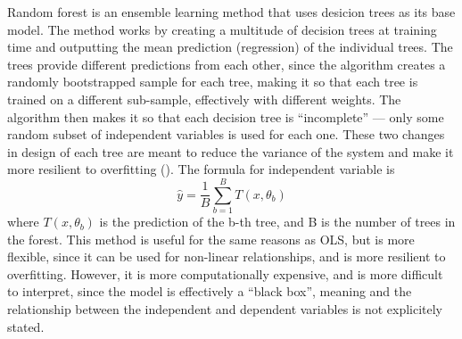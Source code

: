 \documentclass[12pt]{report}
\begin{document}
Random forest is an ensemble learning method that uses desicion trees as its base model. The method works by creating a multitude of decision trees at training time and outputting the mean prediction (regression) of the individual trees. The trees provide different predictions from each other, since the algorithm creates a randomly bootstrapped sample for each tree, making it so that each tree is trained on a different sub-sample, effectively with different weights. The algorithm then makes it so that each decision tree is ``incomplete'' --- only some random subset of independent variables is used for each one. These two changes in design of each tree are meant to reduce the variance of the system and make it more resilient to overfitting (\cite{Breiman2001}). The formula for independent variable is
\begin{equation}
	\hat{y} = \frac{1}{B}\sum_{b=1}^{B}T(x, \theta_b)
\end{equation}
where $T(x, \theta_b)$ is the prediction of the b-th tree, and B is the number of trees in the forest. This method is useful for the same reasons as OLS, but is more flexible, since it can be used for non-linear relationships, and is more resilient to overfitting. However, it is more computationally expensive, and is more difficult to interpret, since the model is effectively a ``black box'', meaning and the relationship between the independent and dependent variables is not explicitely stated.
\end{document}
